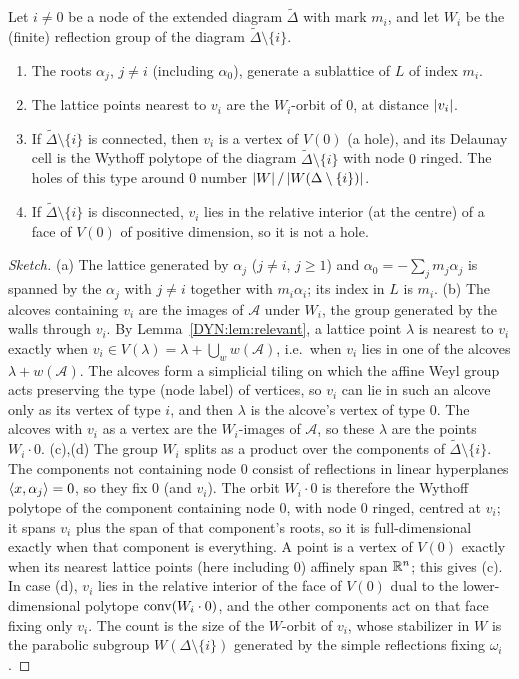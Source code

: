 \begin{theorem}\label{DYN:thm:holes}
Let $i\neq0$ be a node of the extended diagram $\tilde\Delta$ with mark $m_i$, and let $W_i$ be the
(finite) reflection group of the diagram $\tilde\Delta\setminus\{i\}$.
\begin{enumerate}[label=(\alph*)]
\item The roots $\alpha_j$, $j\neq i$ (including $\alpha_0$), generate a sublattice of $L$ of index $m_i$.
\item The lattice points nearest to $v_i$ are the $W_i$-orbit of $0$, at distance $\left\lvert v_i \right\rvert$.
\item If $\tilde\Delta\setminus\{i\}$ is connected, then $v_i$ is a vertex of $V(0)$ (a hole), and its
  Delaunay cell is the Wythoff polytope of the diagram $\tilde\Delta\setminus\{i\}$ with node $0$ ringed.
  The holes of this type around $0$ number $\left\lvert W \right\rvert/\left\lvert W(\Delta\setminus\{i\}) \right\rvert$.
\item If $\tilde\Delta\setminus\{i\}$ is disconnected, $v_i$ lies in the relative interior (at the
  centre) of a face of $V(0)$ of positive dimension, so it is not a hole.
\end{enumerate}
\end{theorem}

\begin{proof}[Sketch]
(a) The lattice generated by $\alpha_j$ ($j\ne i$, $j\ge1$) and $\alpha_0=-\sum_jm_j\alpha_j$ is spanned by
the $\alpha_j$ with $j\ne i$ together with $m_i\alpha_i$; its index in $L$ is $m_i$.
(b) The alcoves containing $v_i$ are the images of $\mathcal A$ under $W_i$, the group generated by the
walls through $v_i$. By Lemma~\ref{DYN:lem:relevant}, a lattice point $\lambda$ is nearest to $v_i$ exactly
when $v_i\in V(\lambda)=\lambda+\bigcup_ww(\mathcal A)$, i.e.\ when $v_i$ lies in one of the alcoves
$\lambda+w(\mathcal A)$. The alcoves form a simplicial tiling on which the affine Weyl group acts
preserving the type (node label) of vertices, so $v_i$ can lie in such an alcove only as its vertex of
type $i$, and then $\lambda$ is the alcove's vertex of type $0$. The alcoves with $v_i$ as a vertex are
the $W_i$-images of $\mathcal A$, so these $\lambda$ are the points $W_i\cdot0$.
(c),(d) The group $W_i$ splits as a product over the components of $\tilde\Delta\setminus\{i\}$. The
components not containing node $0$ consist of reflections in linear hyperplanes $\langle x, \alpha_j\rangle=0$, so
they fix $0$ (and $v_i$). The orbit $W_i\cdot0$ is therefore the Wythoff polytope of the component
containing node $0$, with node $0$ ringed, centred at $v_i$; it spans $v_i$ plus the span of that
component's roots, so it is full-dimensional exactly when that component is everything. A point is a
vertex of $V(0)$ exactly when its nearest lattice points (here including $0$) affinely span $\mathbb{R}^n$; this
gives (c). In case (d), $v_i$ lies in the relative interior of the face of $V(0)$ dual to the
lower-dimensional polytope $\operatorname{conv}(W_i\cdot0)$, and the other components act on that face fixing only
$v_i$. The count is the size of the $W$-orbit of $v_i$, whose stabilizer in $W$ is the parabolic
subgroup $W(\Delta\setminus\{i\})$ generated by the simple reflections fixing $\omega_i$.
\end{proof}

